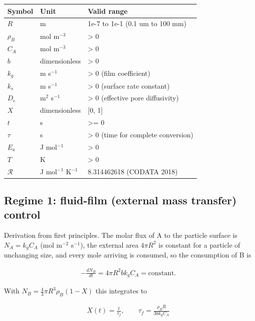\documentclass[10pt,a4paper,twoside]{report}
\begin{document}
\begin{center}
\footnotesize
\begin{tabular}{@{}llp{}@{}}
\toprule
Symbol & Unit & Valid range \\
\midrule
$R$ & m & 1e-7 to 1e-1 (0.1 um to 100 mm) \\
$\rho_B$ & mol m$^{-3}$ & > 0 \\
$C_A$ & mol m$^{-3}$ & > 0 \\
$b$ & dimensionless & > 0 \\
$k_g$ & m s$^{-1}$ & > 0 (film coefficient) \\
$k_s$ & m s$^{-1}$ & > 0 (surface rate constant) \\
$D_e$ & m$^{2}$ s$^{-1}$ & > 0 (effective pore diffusivity) \\
$X$ & dimensionless & [0, 1] \\
$t$ & s & >= 0 \\
$\tau$ & s & > 0 (time for complete conversion) \\
$E_a$ & J mol$^{-1}$ & > 0 \\
$T$ & K & > 0 \\
$\mathcal{R}$ & J mol$^{-1}$ K$^{-1}$ & 8.314462618 (CODATA 2018) \\
\bottomrule
\end{tabular}
\end{center}

\subsection*{Regime 1: fluid-film (external mass transfer) control}

Derivation from first principles. The molar flux of A to the particle surface is $N_A = k_g C_A$ (mol m$^{-2}$ s$^{-1}$), the external area $4\pi R^2$ is constant for a particle of unchanging size, and every mole arriving is consumed, so the consumption of B is

\begin{equation*}
\begin{gathered}
-\frac{dN_B}{dt} = 4\pi R^2 b k_g C_A = \mathrm{constant}.
\end{gathered}
\end{equation*}

With $N_B = \tfrac{4}{3}\pi R^3 \rho_B (1-X)$ this integrates to

\begin{equation*}
\begin{gathered}
X(t) = \frac{t}{\tau_f}, \qquad \boxed{\tau_f = \frac{\rho_B R}{3 b k_g C_A}}
\end{gathered}
\end{equation*}
\end{document}
